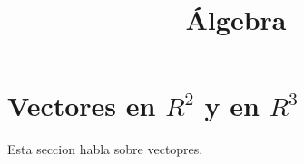 \documentclass[alge.tex]{subfiles}
\title{\'Algebra}
\begin{document}
\maketitle
\section{Vectores en \(R^2\) y en \(R^3\)}
Esta seccion habla sobre vectopres.
\end{document}
